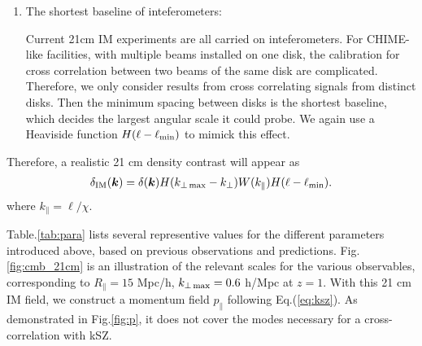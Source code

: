 \begin{enumerate}
\item The shortest baseline of inteferometers:

Current 21cm IM experiments are all carried on inteferometers. 
For CHIME-like facilities, with multiple beams installed on one disk, 
the calibration for cross correlation between two beams of the same disk 
are complicated. 
Therefore, we only consider results from cross correlating signals from distinct disks. 
Then the minimum spacing between disks is the shortest baseline, which decides the largest angular scale it could probe.  We again use a Heaviside function 
$H(\ell-\ell_\mathrm{min})$ to mimick this effect. 
\end{enumerate}
Therefore, a realistic 21 cm density contrast will appear as 
\begin{eqnarray}
\label{eq:ns}
    \delta_\mathrm{IM}(\bm{k})=\delta(\bm{k})H(k_{\perp\,\mathrm{max}}-k_\perp)W(k_\parallel)H(\ell-\ell_\mathrm{min}).
\end{eqnarray}
where $k_\parallel = \ell / \chi$. 

Table.\ref{tab:para} lists several representive values for the different parameters introduced above, based on previous observations and predictions. Fig. \ref{fig:cmb_21cm} is an illustration of the relevant scales for the various observables, corresponding to $R_\parallel=15$ Mpc/h, $k_{\perp\,\mathrm{max}}=0.6$ h/Mpc at $z=1$. With this 21 cm IM field, we construct a momentum field $p_\parallel$ following Eq.(\ref{eq:ksz}). As demonstrated in Fig.\ref{fig:p}, it does not cover the modes necessary for a cross-correlation with kSZ.

